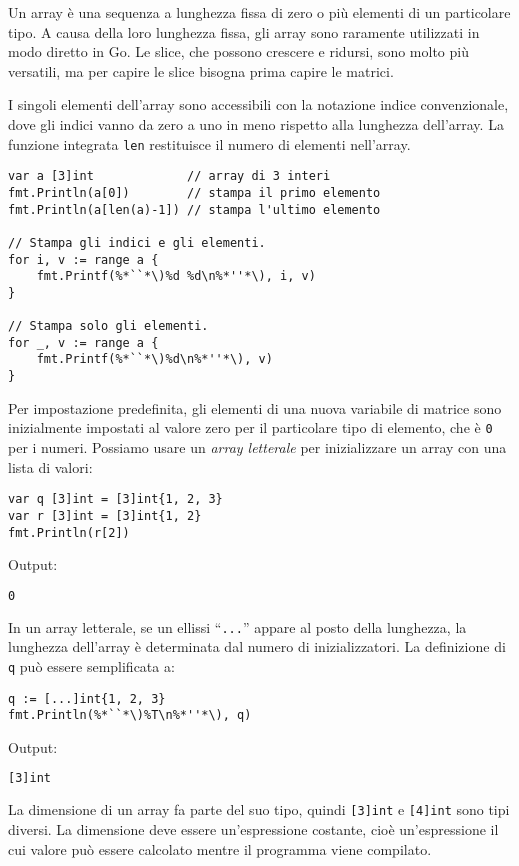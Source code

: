 %
Un array è una sequenza a lunghezza fissa di zero o più elementi di un particolare tipo.
A causa della loro lunghezza fissa, gli array sono raramente utilizzati in modo diretto in Go.
Le slice, che possono crescere e ridursi, sono molto più versatili, ma per capire le slice bisogna prima capire le matrici.

I singoli elementi dell'array sono accessibili con la notazione indice convenzionale, dove gli indici vanno da zero a uno in meno rispetto alla lunghezza dell'array.
La funzione integrata \verb|len| restituisce il numero di elementi nell'array.
\begin{lstlisting}[frame=single, label={lst:lstlisting3-1.1}]
var a [3]int             // array di 3 interi
fmt.Println(a[0])        // stampa il primo elemento
fmt.Println(a[len(a)-1]) // stampa l'ultimo elemento

// Stampa gli indici e gli elementi.
for i, v := range a {
    fmt.Printf(%*``*\)%d %d\n%*''*\), i, v)
}

// Stampa solo gli elementi.
for _, v := range a {
    fmt.Printf(%*``*\)%d\n%*''*\), v)
}
\end{lstlisting}
Per impostazione predefinita, gli elementi di una nuova variabile di matrice sono inizialmente impostati al valore zero per il particolare tipo di elemento, che è \verb|0| per i numeri.
Possiamo usare un \textit{array letterale} per inizializzare un array con una lista di valori:
\begin{lstlisting}[frame=single, label={lst:lstlisting3-1.2}]
var q [3]int = [3]int{1, 2, 3}
var r [3]int = [3]int{1, 2}
fmt.Println(r[2])
\end{lstlisting}
Output:
\begin{lstlisting}[language=bash, frame=L, label={lst:lstlisting3-1.3}]
0
\end{lstlisting}
In un array letterale, se un ellissi ``\verb|...|'' appare al posto della lunghezza, la lunghezza dell'array è determinata dal numero di inizializzatori.
La definizione di \verb|q| può essere semplificata a:
\begin{lstlisting}[frame=single, label={lst:lstlisting3-1.4}]
q := [...]int{1, 2, 3}
fmt.Println(%*``*\)%T\n%*''*\), q)
\end{lstlisting}
Output:
\begin{lstlisting}[language=bash, frame=L, label={lst:lstlisting3-1.5}]
[3]int
\end{lstlisting}
La dimensione di un array fa parte del suo tipo, quindi \verb|[3]int| e \verb|[4]int| sono tipi diversi.
La dimensione deve essere un'espressione costante, cioè un'espressione il cui valore può essere calcolato mentre il programma viene compilato.
